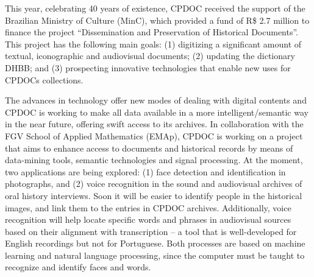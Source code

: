 

This year, celebrating 40 years of existence, CPDOC received the
support of the Brazilian Ministry of Culture (MinC), which provided a fund of R\$ 2.7 million to finance the project
``Dissemination and Preservation of Historical Documents''. This project has
the following main goals: (1) digitizing a significant amount of
textual, iconographic and audiovisual documents; (2) updating the
dictionary DHBB; and (3) prospecting innovative technologies that
enable new uses for CPDOCs collections.

The advances in technology offer new modes of dealing with digital
contents and CPDOC is working to make all data available in a more
intelligent/semantic way in the near future, offering swift access to
its archives. In collaboration with the FGV School of Applied Mathematics (EMAp), CPDOC is working on a
project that aims to enhance access to documents and historical
records by means of data-mining tools, semantic technologies and signal
processing. At the moment, two applications are being explored: (1)
face detection and identification in photographs, and (2) voice
recognition in the sound and audiovisual archives of oral history
interviews. Soon it will be easier to identify people in the historical images,
and link them to the entries in CPDOC archives. Additionally, voice recognition will help locate specific
words and phrases in audiovisual sources based on their alignment with
transcription -- a tool that is well-developed for English recordings
but not for Portuguese. Both processes are based on machine
learning and natural language processing, since the computer must be
taught to recognize and identify faces and words.

